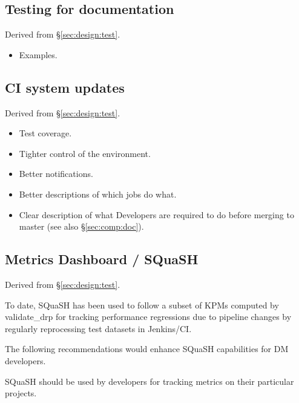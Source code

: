 \subsection{Testing for documentation}

Derived from \S\ref{sec:design:test}.


\begin{itemize}

  \item{Examples.}

\end{itemize}

\subsection{CI system updates}
\label{sec:comp:ci}

Derived from \S\ref{sec:design:test}.


\begin{itemize}

  \item{Test coverage.}
  \item{Tighter control of the environment.}
  \item{Better notifications.}
  \item{Better descriptions of which jobs do what.}
  \item{Clear description of what Developers are required to do before merging
  to master (see also \S\ref{sec:comp:doc}).}

\end{itemize}


\subsection{Metrics Dashboard / SQuaSH}

Derived from \S\ref{sec:design:test}.


To date, SQuaSH has been used to follow a subset of KPMs computed by validate\_drp for tracking performance regressions due to pipeline changes by regularly reprocessing test datasets in Jenkins/CI.

The following recommendations would enhance SQuaSH capabilities for DM developers.

\begin{recommendation}
SQuaSH should be used by developers for tracking metrics on their particular projects.
\end{recommendation}


